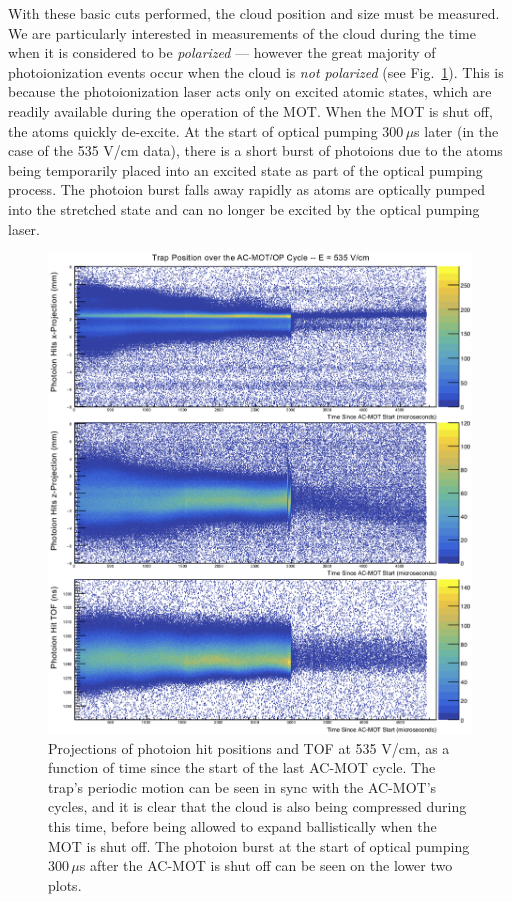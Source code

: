 With these basic cuts performed, the cloud position and size must be measured.  We are particularly interested in measurements of the cloud during the time when it is considered to be \emph{polarized} --- however the great majority of photoionization events occur when the cloud is \emph{not polarized} (see Fig.~\ref{fig:position_v_acmottime_3axes}).  This is because the photoionization laser acts only on excited atomic states, which are readily available during the operation of the MOT.  When the MOT is shut off, the atoms quickly de-excite.  At the start of optical pumping 300$\,\mu$s later (in the case of the 535 V/cm data), there is a short burst of photoions due to the atoms being temporarily placed into an excited state as part of the optical pumping process.  The photoion burst falls away rapidly as atoms are optically pumped into the stretched state and can no longer be excited by the optical pumping laser.  

\begin{figure}[h!tb]
	\centering
	\includegraphics[width=.999\linewidth]
	{Figures/rMCP_xyz_vs_acmottime.png}
	\caption[Photoion Hit Positions at 535 V/cm, as a function of AC-MOT Time]{Projections of photoion hit positions and TOF at 535 V/cm, as a function of time since the start of the last AC-MOT cycle.  The trap's periodic motion can be seen in sync with the AC-MOT's cycles, and it is clear that the cloud is also being compressed during this time, before being allowed to expand ballistically when the MOT is shut off.  The photoion burst at the start of optical pumping 300$\,\mu$s after the AC-MOT is shut off can be seen on the lower two plots. 	}	
	\label{fig:position_v_acmottime_3axes}
\end{figure}

